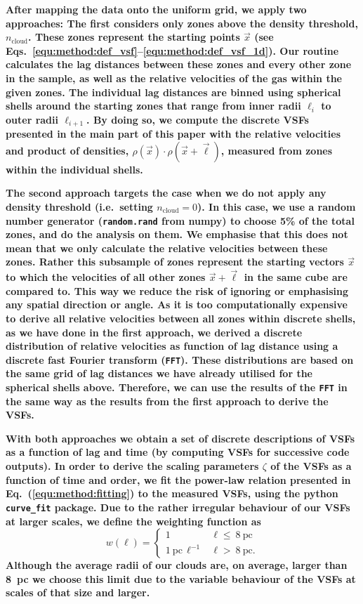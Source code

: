 \textbf{
After mapping the data onto the uniform grid, we apply two approaches: 
The first considers only zones above the density threshold, $n_\mathrm{cloud}$.
These zones represent the starting points $\vec{x}$ (see Eqs.~\ref{equ:method:def_vsf}--\ref{equ:method:def_vsf_1d}).
Our routine calculates the lag distances between these zones and every other zone in the sample, as well as the relative velocities of the gas within the given zones. 
The individual lag distances are binned using spherical shells around the starting zones that range from inner radii $\ell_{i}$ to outer radii $\ell_{i+1}$. 
By doing so, we compute the discrete VSFs presented in the main part of this paper with the relative velocities and product of densities, $\rho(\vec{x}) \cdot \rho(\vec{x}+\vec{\ell})$, measured from zones within the individual shells.
}

\textbf{
The second approach targets the case when we do not apply any density threshold (i.e.~setting $n_\mathrm{cloud} =0$).
In this case, we use a random number generator (\texttt{random.rand} from numpy) to choose 5\% of the total zones, and do the analysis on them.
We emphasise that this does not mean that we only calculate the relative velocities between these zones. Rather this subsample of zones represent the starting vectors $\vec{x}$ to which the velocities of all other zones $\vec{x} + \vec{\ell}$ in the same cube are compared to. This way we reduce the risk of ignoring or emphasising any spatial direction or angle.
As it is too computationally expensive to derive all relative velocities between all zones within discrete shells, as we have done in the first approach, we derived a discrete distribution of relative velocities as function of lag distance using a discrete fast Fourier transform (\texttt{FFT}). 
These distributions are based on the same grid of lag distances we have already utilised for the spherical shells above.
Therefore, we can use the results of the \texttt{FFT} in the same way as the results from the first approach to derive the VSFs.
}

\textbf{
With both approaches we obtain a set of discrete descriptions of VSFs as a function of  lag  and time (by computing VSFs for successive code outputs).
In order to derive the scaling parameters $\zeta$ of the VSFs as a function of time and order, we fit the power-law relation presented in Eq.~(\ref{equ:method:fitting}) to the measured VSFs, using the python \texttt{curve\_fit} package.
Due to the rather irregular behaviour of our VSFs at larger scales, we define the weighting function as
\begin{equation}
    w\left(\ell\right) = \begin{cases}
        1 & \ell \leq~\mathrm{8~pc} \\
        \mathrm{1~pc}\,\ell^{-1} & \ell >~\mathrm{8~pc}.
    \end{cases}
\end{equation}
\noindent Although the average radii of our clouds are, on average, larger than 8~pc we choose this limit due to the variable behaviour of the VSFs at scales of that size and larger.
}

